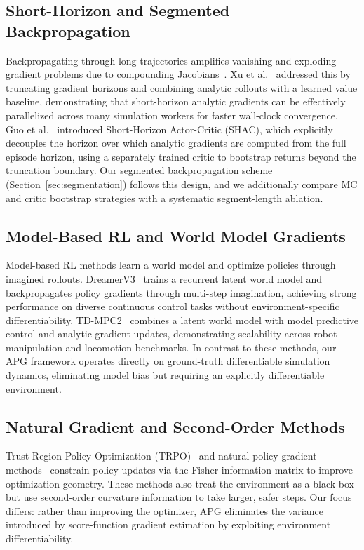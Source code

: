 \documentclass[11pt,a4paper]{article}
\begin{document}
\subsection{Short-Horizon and Segmented Backpropagation}
\label{sec:related_shac}

Backpropagating through long trajectories amplifies vanishing and exploding gradient problems due to compounding Jacobians~\cite{pascanu2013exploding}. Xu et al.~\cite{xu2022accelerated} addressed this by truncating gradient horizons and combining analytic rollouts with a learned value baseline, demonstrating that short-horizon analytic gradients can be effectively parallelized across many simulation workers for faster wall-clock convergence. Guo et al.~\cite{guo2023shac} introduced Short-Horizon Actor-Critic (SHAC), which explicitly decouples the horizon over which analytic gradients are computed from the full episode horizon, using a separately trained critic to bootstrap returns beyond the truncation boundary. Our segmented backpropagation scheme (Section~\ref{sec:segmentation}) follows this design, and we additionally compare MC and critic bootstrap strategies with a systematic segment-length ablation.

\subsection{Model-Based RL and World Model Gradients}
\label{sec:related_mbrl}

Model-based RL methods learn a world model and optimize policies through imagined rollouts. DreamerV3~\cite{hafner2023dreamerv3} trains a recurrent latent world model and backpropagates policy gradients through multi-step imagination, achieving strong performance on diverse continuous control tasks without environment-specific differentiability. TD-MPC2~\cite{hansen2024tdmpc2} combines a latent world model with model predictive control and analytic gradient updates, demonstrating scalability across robot manipulation and locomotion benchmarks. In contrast to these methods, our APG framework operates directly on ground-truth differentiable simulation dynamics, eliminating model bias but requiring an explicitly differentiable environment.

\subsection{Natural Gradient and Second-Order Methods}
\label{sec:related_natural}

Trust Region Policy Optimization (TRPO)~\cite{schulman2015trpo} and natural policy gradient methods~\cite{amari1998natural,martens2015optimizing} constrain policy updates via the Fisher information matrix to improve optimization geometry. These methods also treat the environment as a black box but use second-order curvature information to take larger, safer steps. Our focus differs: rather than improving the optimizer, APG eliminates the variance introduced by score-function gradient estimation by exploiting environment differentiability.
\end{document}
